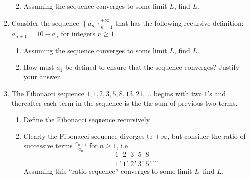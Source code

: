 \documentclass[12pt]{article}
\newif\ifans
\begin{document}
\begin{enumerate}
\begin{enumerate}
\ifans{\fbox{$a_1=\sqrt{30}, a_{n+1}=\sqrt{30+a_n}$ for integers $n\geq1$.}} \fi

\item Assuming the sequence converges to some limit $L$, find $L$.

\ifans{\fbox{$L=6$.}} \fi

\end{enumerate}

\item Consider the sequence $\left\{ a_n \right\}_{n = 1}^{+\infty}$ that has the following recursive definition: \newline $a_{n+1}=10-a_n$ for integers $n\geq1$.

\begin{enumerate}

\item Assuming the sequence converges to some limit $L$, find $L$.

\ifans{\fbox{$L=5$.}} \fi

\item How must $a_1$ be defined to ensure that the sequence converges?  Justify your answer.

\ifans{\fbox{\parbox{1\linewidth}{If $a_1 = 5$, the sequence is $5, 5, 5, 5, ...$, which clearly converges to 5.  If $a_1 \neq 5$, say $a_1 = K (K \neq 5)$, then the sequence oscillates bewteen $K$ and $10-K$, e.g. 
if $a_1 = 3$ we have $3, 7, 3, 7, 3, 7, ...$  Such a sequence diverges.}}} \fi

\end{enumerate}

\item The \underline{Fibonacci sequence} $1, 1, 2, 3, 5, 8, 13, 21, ...$ begins with two $1$'s and thereafter each term in the sequence is the the sum of previous two terms.

\begin{enumerate}

\item Define the Fibonacci sequence recursively.

\ifans{\fbox{$a_1=1, a_2=1, a_{n+2}=a_n + a_{n+1}$ for integers $n\geq1$.}} \fi

\item Clearly the Fibonacci sequence diverges to $+\infty$, but consider the ratio of successive terms $\frac{a_{n+1}}{a_n}$ for $n\geq1$, i.e $$\frac{1}{1}, \frac{2}{1}, \frac{3}{2}, \frac{5}{3}, 
\frac{8}{5}, ...$$  Assuming this ``ratio sequence'' converges to some limit $L$, find $L$.


\end{enumerate}
\end{enumerate}
\end{document}
